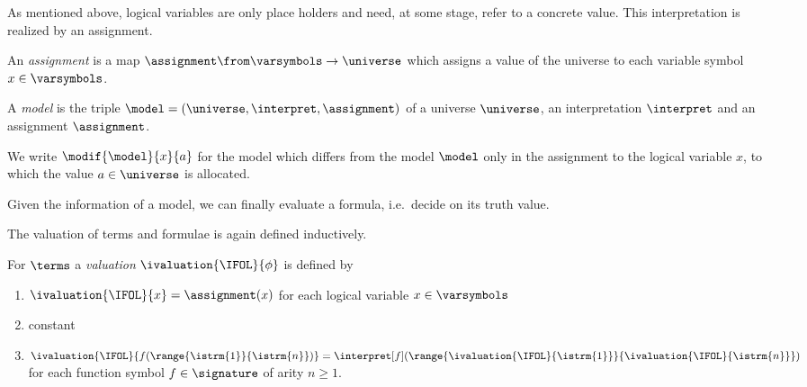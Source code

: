             As mentioned above, logical variables are only place holders and need, at some stage, refer to a concrete value. This interpretation is realized by an assignment.

            \begin{definition}[Assignment]
                An \emph{assignment} is a map $\assignment\from\varsymbols\to\universe$ which assigns a value of the universe to each variable symbol $x\in\varsymbols$.
            \end{definition}

            \begin{definition}[Model]
                A \emph{model} is the triple $\model=(\universe,\interpret,\assignment)$ of a universe $\universe$, an interpretation $\interpret$ and an assignment $\assignment$.
            \end{definition}

            We write $\modif{\model}{x}{a}$ for the model which differs from the model $\model$ only in the assignment to the logical variable $x$, to which the value $a\in\universe$ is allocated.

            Given the information of a model, we can finally evaluate a formula, i.e.\ decide on its truth value.

            The valuation of terms and formulae is again defined inductively.
            \begin{definition}
                For $\terms$ a \emph{valuation} $\ivaluation{\IFOL}{\phi}$ is defined by
                \begin{enumerate}
                    \item $\ivaluation{\IFOL}{x} = \assignment(x)$ for each logical variable $x\in\varsymbols$
                    \item constant
                    \item $\ivaluation{\IFOL}{f(\range{\istrm{1}}{\istrm{n}})} = \interpret[f](\range{\ivaluation{\IFOL}{\istrm{1}}}{\ivaluation{\IFOL}{\istrm{n}}})$ for each function symbol $f\in\signature$ of arity $n\geq 1$.
                \end{enumerate}
            \end{definition}

